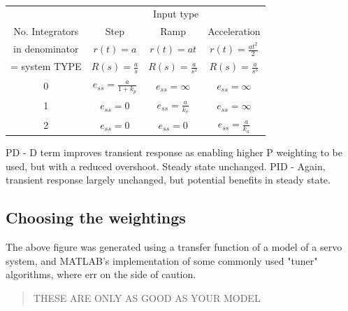 \documentclass[class=report, crop=false, 12pt,a4paper]{standalone}
\begin{document}
\begin{table}[H]
  \begin{center}
  \begin{tabular}{|c|c|c|c|}
    \hline
    & \multicolumn{3}{c|}{Input type}\\
    \cline{2-4}
    No. Integrators & Step & Ramp & Acceleration\\
    in denominator & $r(t) = a$ & $r(t) = at$ & $r(t) = \frac{at^2}{2}$\\
    = system TYPE & $R(s) = \frac{a}{s}$ & $R(s) = \frac{a}{s^2}$ & $R(s) = \frac{a}{s^3}$\\
    \hline
    \hline
    0 & $e_{ss} = \frac{a}{1+k_p}$ & $e_{ss} = \infty$ & $e_{ss} = \infty$\\
    \hline
    1 & $e_{ss} = 0$ & $e_{ss} = \frac{a}{k_v}$ & $e_{ss} = \infty$\\
    \hline
    2 & $e_{ss} = 0$ & $e_{ss} = 0$ & $e_{ss} = \frac{a}{k_a}$\\
    \hline
  \end{tabular}
  \end{center}
  \caption{}
\end{table}
PD - D term improves transient response as enabling higher P weighting to be used, but with a reduced overshoot. Steady state unchanged. PID - Again, transient response largely unchanged, but potential benefits in steady state. 
\subsection{Choosing the weightings}
The above figure was generated using a transfer function of a model of a servo system, and MATLAB's implementation of some commonly used "tuner" algorithms, where err on the side of caution.
\begin{quote}
  THESE ARE ONLY AS GOOD AS YOUR MODEL
\end{quote}
\end{document}
